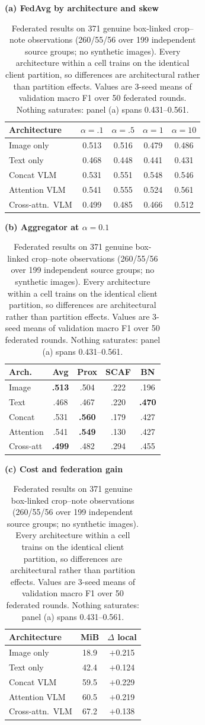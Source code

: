\documentclass[conference]{IEEEtran}
\begin{document}
\begin{table}[t]
\caption{Federated results on 371 genuine box-linked crop--note observations (260/55/56 over 199 independent source groups; no synthetic images). Every architecture within a cell trains on the identical client partition, so differences are architectural rather than partition effects. Values are 3-seed means of validation macro F1 over 50 federated rounds. Nothing saturates: panel (a) spans 0.431--0.561.}
\label{tab:standard_suite}
\centering\scriptsize
\setlength\tabcolsep{2.7pt}
\begin{minipage}[t]{0.38\textwidth}
\centering
\textbf{(a) FedAvg by architecture and skew}
\begin{tabular}{lcccc}
\toprule
Architecture & $\alpha{=}.1$ & $\alpha{=}.5$ & $\alpha{=}1$ & $\alpha{=}10$\\
\midrule
Image only        & 0.513 & 0.516 & 0.479 & 0.486\\
Text only         & 0.468 & 0.448 & 0.441 & 0.431\\
Concat VLM        & 0.531 & 0.551 & 0.548 & 0.546\\
Attention VLM     & 0.541 & 0.555 & 0.524 & 0.561\\
Cross-attn.\ VLM  & 0.499 & 0.485 & 0.466 & 0.512\\
\bottomrule
\end{tabular}
\end{minipage}\hfill
\begin{minipage}[t]{0.30\textwidth}
\centering
\textbf{(b) Aggregator at $\alpha{=}0.1$}
\begin{tabular}{lcccc}
\toprule
Arch. & Avg & Prox & SCAF & BN\\
\midrule
Image      & \textbf{.513} & .504 & .222 & .196\\
Text       & .468 & .467 & .220 & \textbf{.470}\\
Concat     & .531 & \textbf{.560} & .179 & .427\\
Attention  & .541 & \textbf{.549} & .130 & .427\\
Cross-att  & \textbf{.499} & .482 & .294 & .455\\
\bottomrule
\end{tabular}
\end{minipage}\hfill
\begin{minipage}[t]{0.28\textwidth}
\centering
\textbf{(c) Cost and federation gain}
\begin{tabular}{lcc}
\toprule
Architecture & MiB & $\Delta$ local\\
\midrule
Image only        & 18.9 & $+$0.215\\
Text only         & 42.4 & $+$0.124\\
Concat VLM        & 59.5 & $+$0.229\\
Attention VLM     & 60.5 & $+$0.219\\
Cross-attn.\ VLM  & 67.2 & $+$0.138\\
\bottomrule
\end{tabular}
\end{minipage}
\end{table}
\end{document}
